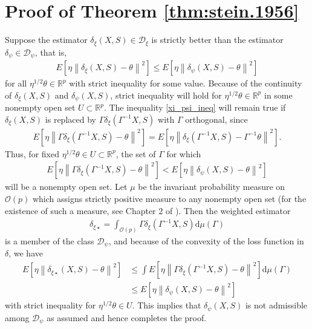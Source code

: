 \documentclass[preprint,11pt]{imsart}
\numberwithin{equation}{section}
\theoremstyle{plain}
\theoremstyle{definition}
\theoremstyle{remark}
\newcommand{\rd}{\mathrm{d}}
\begin{document}
\section{Proof of Theorem \ref{thm:stein.1956}}
\label{sec:ap.stein.1956}
 Suppose the estimator $\delta_\xi(X,S)\in\mathcal{D}_\xi$
is strictly better than the estimator $\delta_\psi\in\mathcal{D}_\psi$,  that is,
\begin{align}\label{xi_psi_ineq}
 E\left[\eta\left\|\delta_\xi(X,S)-\theta\right\|^2\right]
 \leq  E\left[\eta\left\|\delta_\psi(X,S)-\theta\right\|^2\right]
\end{align}
 for all $\eta^{1/2}\theta\in\mathbb{R}^p$ with strict inequality for some value.
Because of the continuity of $\delta_\xi(X,S)$ and $\delta_\psi(X,S)$,
 strict inequality will hold for
  $\eta^{1/2}\theta\in\mathbb{R}^p$ in some nonempty open set
$U\subset\mathbb{R}^p$.
The inequality \eqref{xi_psi_ineq} will remain true
if $\delta_\xi(X,S)$ is replaced by $ \Gamma\delta_\xi(\Gamma^{-1}X,S)$
with $\Gamma$ orthogonal, since
\begin{align*}
 E\left[\eta\left\|\Gamma\delta_\xi(\Gamma^{-1}X,S)-\theta\right\|^2\right] 
= E\left[\eta\left\|\delta_\xi(\Gamma^{-1}X,S)-\Gamma^{-1}\theta\right\|^2\right].
\end{align*}
 Thus, for fixed  $\eta^{1/2}\theta\in U\subset\mathbb{R}^p$,
the set of $\Gamma$ for which
\begin{align*}
 E\left[\eta\left\|\Gamma\delta_\xi(\Gamma^{-1}X,S)-\theta\right\|^2\right] 
<E\left[\eta\left\|\delta_\psi(X,S)-\theta\right\|^2\right]
\end{align*}
will be a nonempty open set.
Let $\mu$ be the invariant probability measure on $\mathcal{O}(p)$
which assigns strictly positive measure to any nonempty open set
(for the existence of such a measure, see Chapter 2 of \cite{Weil-1940}).
Then the weighted estimator
\begin{align*}
\delta_{\xi\star}= \int_{\mathcal{O}(p)} \Gamma\delta_\xi(\Gamma^{-1}X,S)\rd \mu(\Gamma)
\end{align*}
 is a member of the class $\mathcal{D}_\psi$,
 and because of the convexity of the loss function in $\delta$, we have 
\begin{align*}
 E\left[\eta\left\|\delta_{\xi\star}(X,S)-\theta\right\|^2\right] 
 &\leq \int E\left[\eta\left\|\Gamma\delta_\xi(\Gamma^{-1}X,S)-\theta\right\|^2\right]\rd \mu(\Gamma) \\
 &\leq E\left[\eta\left\|\delta_\psi(X,S)-\theta\right\|^2\right]
\end{align*}
with strict inequality for $\eta^{1/2}\theta\in U$.
This implies that $\delta_\psi(X,S)$ is not admissible among $\mathcal{D}_\psi$ as assumed 
and hence completes the proof.
\end{document}
